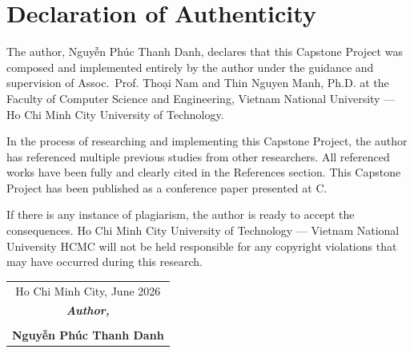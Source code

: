 \chapter*{Declaration of Authenticity}

The author, Nguyễn Phúc Thanh Danh, declares that this Capstone Project was composed and implemented entirely by the author under the guidance and supervision of Assoc.~Prof. Thoại Nam and Thin Nguyen Manh, Ph.D. at the Faculty of Computer Science and Engineering, Vietnam National University --- Ho Chi Minh City University of Technology.
 
\noindent In the process of researching and implementing this Capstone Project, the author has referenced multiple previous studies from other researchers. All referenced works have been fully and clearly cited in the References section. This Capstone Project has been published as a conference paper presented at C.

\noindent If there is any instance of plagiarism, the author is ready to accept the consequences. Ho Chi Minh City University of Technology --- Vietnam National University HCMC will not be held responsible for any copyright violations that may have occurred during this research.

\vspace{2cm}

\begin{flushright}
\begin{tabular}{c}
    Ho Chi Minh City, June 2026 \\
    \textit{\textbf{Author,}} \\
    \vspace{1.2cm} \\
    \textbf{Nguyễn Phúc Thanh Danh}
\end{tabular}
\end{flushright}